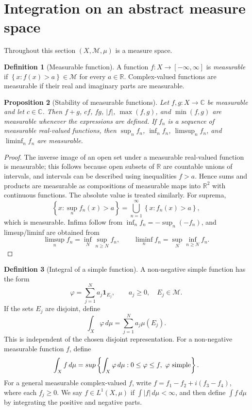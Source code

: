\documentclass[11pt,openany]{book}
\numberwithin{equation}{chapter}
\theoremstyle{definition}
\newtheorem{definition}{Definition}[chapter]
\theoremstyle{plain}
\newtheorem{proposition}[definition]{Proposition}
\theoremstyle{remark}
\newcommand{\R}{\mathbb{R}}
\newcommand{\C}{\mathbb{C}}
\newcommand{\M}{\mathcal{M}}
\newcommand{\1}{\mathbf{1}}
\newcommand{\dd}{\,d}
\newcommand{\abs}[1]{\left\lvert #1\right\rvert}
\newcommand{\set}[1]{\left\{#1\right\}}
\begin{document}
\section{Integration on an abstract measure space}

Throughout this section \((X,\M,\mu)\) is a measure space.

\begin{definition}[Measurable function]
A function \(f:X\to[-\infty,\infty]\) is \emph{measurable} if \(\set{x:f(x)>a}\in\M\) for every \(a\in\R\). Complex-valued functions are measurable if their real and imaginary parts are measurable.
\end{definition}

\begin{proposition}[Stability of measurable functions]
Let \(f,g:X\to\C\) be measurable and let \(c\in\C\). Then \(f+g\), \(cf\), \(fg\), \(\abs{f}\), \(\max(f,g)\), and \(\min(f,g)\) are measurable whenever the expressions are defined. If \(f_n\) is a sequence of measurable real-valued functions, then \(\sup_nf_n\), \(\inf_nf_n\), \(\limsup_nf_n\), and \(\liminf_nf_n\) are measurable.
\end{proposition}

\begin{proof}
The inverse image of an open set under a measurable real-valued function is measurable; this follows because open subsets of \(\R\) are countable unions of intervals, and intervals can be described using inequalities \(f>a\). Hence sums and products are measurable as compositions of measurable maps into \(\R^2\) with continuous functions. The absolute value is treated similarly. For suprema,
\[
  \set{x:\sup_nf_n(x)>a}=\bigcup_{n=1}^{\infty}\set{x:f_n(x)>a},
\]
which is measurable. Infima follow from \(\inf_nf_n=-\sup_n(-f_n)\), and limsup/liminf are obtained from
\[
  \limsup_nf_n=\inf_N\sup_{n\geq N}f_n,
  \qquad
  \liminf_nf_n=\sup_N\inf_{n\geq N}f_n.
\]
\end{proof}

\begin{definition}[Integral of a simple function]
A non-negative simple function has the form
\[
  \varphi=\sum_{j=1}^N a_j\1_{E_j},
  \qquad a_j\geq0,
  \quad E_j\in\M.
\]
If the sets \(E_j\) are disjoint, define
\[
  \int_X\varphi\dd\mu=\sum_{j=1}^Na_j\mu(E_j).
\]
This is independent of the chosen disjoint representation. For a non-negative measurable function \(f\), define
\[
  \int_X f\dd\mu=\\sup\set{\int_X\varphi\dd\mu: 0\leq\varphi\leq f,\ \varphi\text{ simple}}.
\]
For a general measurable complex-valued \(f\), write \(f=f_1-f_2+i(f_3-f_4)\), where each \(f_j\geq0\). We say \(f\in L^1(X,\mu)\) if \(\int\abs{f}\dd\mu<\infty\), and then define \(\int f\dd\mu\) by integrating the positive and negative parts.
\end{definition}
\end{document}
